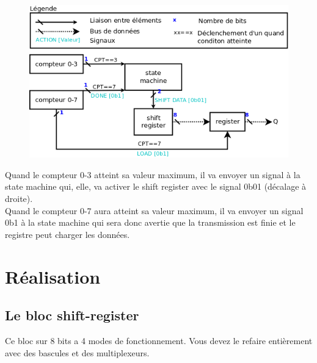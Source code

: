 \documentclass[a4paper]{article} %
\begin{document}
\begin{tcolorbox}[colframe=Monokaimagenta,colback=white]
\begin{figure}[H]
    \centering
    \includegraphics[width=.8\textwidth]{src/schema_bloc.png}
    \label{fig:schem_bloc}
\end{figure}

Quand le compteur 0-3 atteint sa valeur maximum, il va envoyer un signal à la state machine qui, elle, va activer le shift register avec le signal 0b01 (décalage à droite).\\
Quand le compteur 0-7 aura atteint sa valeur maximum, il va envoyer un signal 0b1 à la state machine qui sera donc avertie que la transmission est finie et le registre peut charger les données.

\end{tcolorbox}

\pagebreak
\section {Réalisation}
\subsection{Le bloc shift-register}
Ce bloc sur 8 bits a 4 modes de fonctionnement. Vous devez le refaire entièrement avec des bascules et des multiplexeurs.
\end{document}
